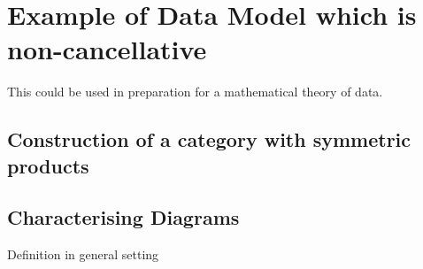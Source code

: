 \documentclass[10pt,a4paper]{scrartcl}
\begin{document}
\section{Example of Data Model which is non-cancellative}
This could be used in preparation for a mathematical theory of data.
\subsection{Construction of a category with symmetric products}

\subsection{Characterising Diagrams}
Definition in general setting


\end{document}
